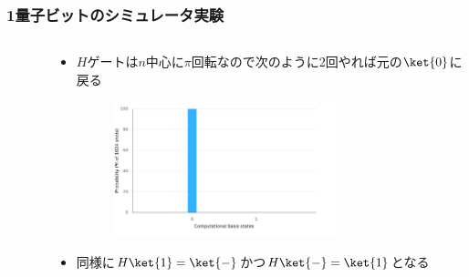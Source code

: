 \begin{frame}
  \frametitle{1量子ビットのシミュレータ実験}

  \begin{columns}
    \begin{column}{0.4\textwidth}
      \begin{figure}
        \HGateFigure
      \end{figure}
    \end{column}
    \begin{column}{0.6\textwidth}
      \begin{itemize}
        \item<+-> $H$ゲートは$n$中心に$\pi$回転なので次のように2回やれば元の$\ket{0}$に戻る
        \begin{figure}
          \centering
        \end{figure}
        \begin{figure}
          \includegraphics[width=0.7\textwidth]{./img/hgate_hgate_histogram.pdf}
        \end{figure}

        \item<+-> 同様に$H\ket{1} = \ket{-}$かつ$H\ket{-} = \ket{1}$となる
      \end{itemize}
    \end{column}
  \end{columns}
\end{frame}

